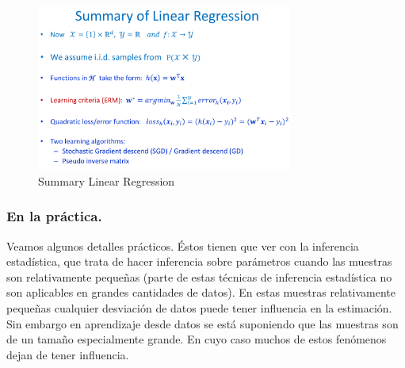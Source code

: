 \documentclass[11pt,a4paper]{article}
\theoremstyle{definition}
\begin{document}
	\begin{figure}[H]
	\centering
	\includegraphics[width=0.75\textwidth]{images/summary_linear_regression}
	\caption{Summary Linear Regression}
	\end{figure}
	
	\subsubsection{En la práctica.}	
	Veamos algunos detalles prácticos. Éstos tienen que ver con la inferencia estadística, que trata de hacer inferencia sobre parámetros cuando las muestras son relativamente pequeñas (parte de estas técnicas de inferencia estadística no son aplicables en grandes cantidades de datos). En estas muestras relativamente pequeñas cualquier desviación de datos puede tener influencia en la estimación. Sin embargo en aprendizaje desde datos se está suponiendo que las muestras son de un tamaño especialmente grande. En cuyo caso muchos de estos fenómenos dejan de tener influencia.
	
\end{document}
